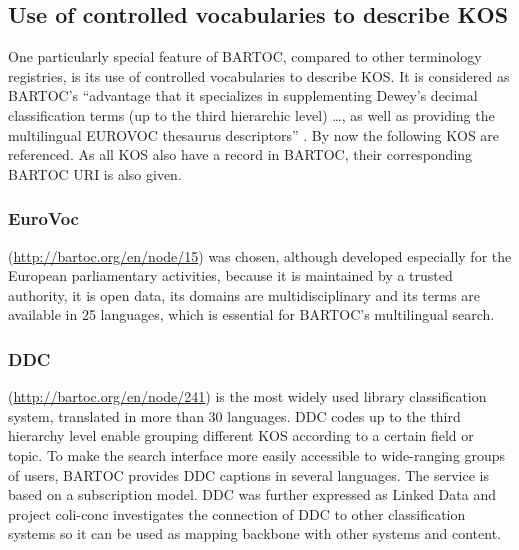 \documentclass[12pt,a4paper]{llncs}
\begin{document}
\begin{table}

\end{table}

\subsection{Use of controlled vocabularies to describe KOS}
One particularly special feature of BARTOC, compared to other terminology registries, is its use of controlled vocabularies to describe KOS. It is considered as BARTOC's ``advantage that it specializes in supplementing Dewey’s decimal classification terms (up to the third hierarchic level) \ldots, as well as providing the multilingual EUROVOC thesaurus descriptors'' \cite{bratkova2014revue}. By now the following KOS are referenced. As all KOS also have a record in BARTOC, their corresponding BARTOC URI is also given.

\subsubsection{EuroVoc}
(\href{http://bartoc.org/en/node/15}{http://bartoc.org/en/node/15}) was chosen, although developed especially for the European parliamentary activities, because it is maintained by a trusted authority, it is open data, its domains are multidisciplinary and its terms are available in 25 languages, which is essential for BARTOC's multilingual search. 

\subsubsection{DDC}
(\href{http://bartoc.org/en/node/241}{http://bartoc.org/en/node/241})
is the most widely used library classification system, translated in more than 30 languages. DDC codes up to the third hierarchy level enable grouping different KOS according to a certain field or topic. To make the search interface more easily accessible to wide-ranging groups of users, BARTOC provides DDC captions in several languages. The service is based on a subscription model. DDC was further expressed as Linked Data \cite{panzer2013dewey} and project coli-conc investigates the connection of DDC to other classification systems so it can be used as mapping backbone with other systems and content.
\end{document}
